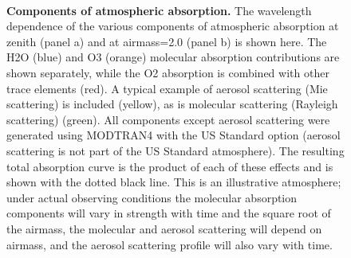 \documentclass[12pt,preprint]{aastex}
\begin{document}
\begin{figure}
\centering
{}\\
\caption{{\small
{\bf Components of atmospheric absorption.} The wavelength dependence
of the various components of atmospheric absorption at zenith (panel
a) and at airmass=2.0 (panel b) is shown here.  The H2O (blue) and O3
(orange) molecular absorption contributions are shown separately,
while the O2 absorption is combined with other trace elements (red). A
typical example of aerosol scattering (Mie scattering) is included
(yellow), as is molecular scattering (Rayleigh scattering)
(green). All components except aerosol scattering were generated using
MODTRAN4 with the US Standard option (aerosol scattering is not part of the US 
Standard atmosphere). The resulting total absorption curve is the product of each
of these effects and is shown with the dotted black line. This is an
illustrative atmosphere; under actual observing conditions the
molecular absorption components will vary in strength with time and
the square root of the airmass, the molecular and aerosol scattering
will depend on airmass, and the aerosol scattering profile will also 
vary with time.}}
\label{fig:absorption_comps}
\end{figure}
\end{document}
